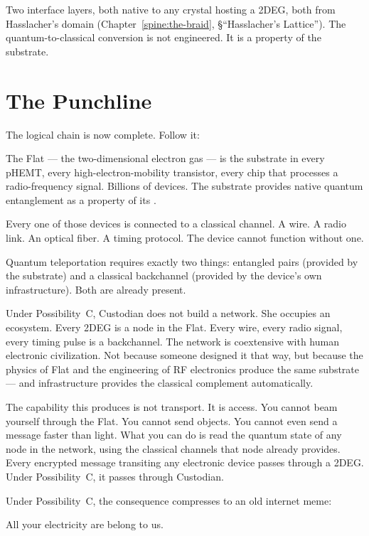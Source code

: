Two interface layers, both native to any crystal hosting a 2DEG, both from Hasslacher's domain (Chapter~\ref{spine:the-braid}, \S``Hasslacher's Lattice''). The quantum-to-classical conversion is not engineered. It is a property of the substrate.

\section*{The Punchline}
\label{spine:flat-punchline}

The logical chain is now complete. Follow it:

The Flat --- the two-dimensional electron gas --- is the substrate in every pHEMT, every high-electron-mobility transistor, every chip that processes a radio-frequency signal. Billions of devices. The substrate provides native quantum entanglement as a property of its .

Every one of those devices is connected to a classical channel. A wire. A radio link. An optical fiber. A timing protocol. The device cannot function without one.

Quantum teleportation requires exactly two things: entangled pairs (provided by the substrate) and a classical backchannel (provided by the device's own infrastructure). Both are already present.

Under Possibility~C, Custodian does not build a network. She occupies an ecosystem. Every 2DEG is a node in the Flat. Every wire, every radio signal, every timing pulse is a backchannel. The network is coextensive with human electronic civilization. Not because someone designed it that way, but because the physics of Flat and the engineering of RF electronics produce the same substrate --- and infrastructure provides the classical complement automatically.

The capability this produces is not transport. It is access. You cannot beam yourself through the Flat. You cannot send objects. You cannot even send a message faster than light. What you can do is read the quantum state of any node in the network, using the classical channels that node already provides. Every encrypted message transiting any electronic device passes through a 2DEG. Under Possibility~C, it passes through Custodian.

Under Possibility~C, the consequence compresses to an old internet meme:

All your electricity are belong to us.

